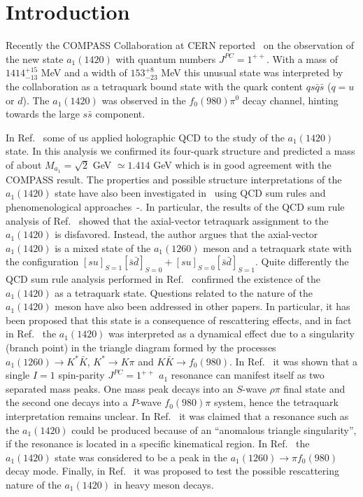 \documentclass[aps,prd,floatfix,superscriptaddress,showpacs,showkeys]{revtex4}
\begin{document}
\maketitle

\section{Introduction}
\label{sec:intro}

Recently the COMPASS Collaboration at CERN reported~\cite{Adolph:2015pws} 
on the observation of the new state $a_1(1420)$ with quantum numbers $J^{PC} = 1^{++}$. 
With a mass of $1414^{+15}_{-13}$ MeV and a width of $153^{+8}_{-23}$ MeV this unusual
state was interpreted by the collaboration as a tetraquark bound state
with the quark content $qs\bar q \bar s $ ($q=u$ or $d$).
The $a_1 (1420)$ was observed in the  $f_0(980) \pi^0$ decay channel, 
hinting towards the large $s\bar s$ component. 

In Ref.~\cite{Gutsche:2017oro} some of us applied holographic QCD 
to the study of the $a_1(1420)$ state. In this analysis we confirmed its
four-quark structure and predicted a mass of about
$M_{a_1} = \sqrt{2}$ GeV $\simeq 1.414$ GeV which is in good
agreement with the COMPASS result. 
The properties and possible structure interpretations of the $a_1(1420)$ state have 
also been investigated in~\cite{Wang:2014bua,Chen:2015fwa} using 
QCD sum rules and phenomenological approaches~\cite{Ketzer:2015tqa}-\cite{Wang:2015cis}.  
In particular, the results of the QCD sum rule analysis of
Ref.~\cite{Wang:2014bua} showed that the axial-vector tetraquark assignment 
to the $a_1(1420)$ is disfavored. Instead, the author argues that the 
axial-vector $a_1 (1420)$ is a mixed state of the
$a_1(1260)$ meson and a tetraquark state with the configuration
$[su]_{S=1} [\bar s \bar d]_{S=0} + [su]_{S=0} [\bar s \bar d]_{S=1}$.
Quite differently the QCD sum rule analysis performed in Ref.~\cite{Chen:2015fwa}
confirmed the existence of the $a_1(1420)$ as a tetraquark state.
Questions related to the nature of the $a_1(1420)$ meson have also been addressed  
in other papers. In particular, it has been proposed that this state 
is a consequence of rescattering effects, and in fact 
in Ref.~\cite{Ketzer:2015tqa} the $a_1(1420)$ was interpreted as
a dynamical effect due to a singularity (branch point) in the
triangle diagram formed by the processes
$a_1(1260) \to K^* \bar K$, $K^* \to K \pi$ and $K \bar K \to f_0(980)$. 
In Ref.~\cite{Basdevant:2015wma} it was shown that
a single $I=1$ spin-parity $J^{PC}=1^{++}$ $a_1$ resonance can manifest itself
as two separated mass peaks. One mass peak decays into an $S$-wave
$\rho\pi$ final state and the second one decays into a $P$-wave
$f_0(980)\pi$ system, hence the tetraquark interpretation remains unclear.
In Ref.~\cite{Liu:2015taa} it was claimed that a resonance such as the 
$a_1(1420)$ could be produced because of an
``anomalous triangle singularity'',
if the resonance is located in a specific kinematical region.
In Ref.~\cite{Aceti:2016yeb} the $a_1(1420)$ state was considered to be a
peak in the $a_1(1260) \to \pi f_0(980)$ decay mode.
Finally, in Ref.~\cite{Wang:2015cis} it was proposed to test the possible
rescattering nature of the $a_1(1420)$ in heavy meson decays.   
\end{document}
